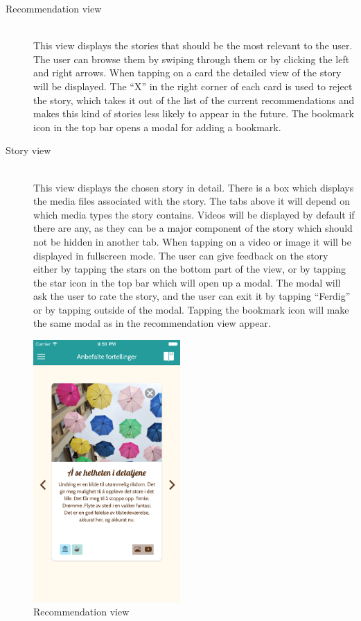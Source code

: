 \begin{description}
	
	\item[Recommendation view] \hfill \\ 
	This view displays the stories that should be the most relevant to the user. The user can browse them by swiping through them or by clicking the left and right arrows. When tapping on a card the detailed view of the story will be displayed. The “X” in the right corner of each card is used to reject the story, which takes it out of the list of the current recommendations and makes this kind of stories less likely to appear in the future. The bookmark icon in the top bar opens a modal for adding a bookmark. 
	
	\item[Story view] \hfill \\
	This view displays the chosen story in detail. There is a box which displays the media files associated with the story. The tabs above it will depend on which media types the story contains. Videos will be displayed by default if there are any, as they can be a major component of the story which should not be hidden in another tab. When tapping on a video or image it will be displayed in fullscreen mode. The user can give feedback on the story either by tapping the stars on the bottom part of the view, or by tapping the star icon in the top bar which will open up a modal. The modal will ask the user to rate the story, and the user can exit it by tapping “Ferdig” or by tapping outside of the modal. Tapping the bookmark icon will make the same modal as in the recommendation view appear. 

\end{description}

\begin{figure}[h!]
	\centering
	\includegraphics[width=0.5\textwidth]{fig/recommendation_view}
	\caption{Recommendation view}
	\label{Fig:recommendation_view}
\end{figure}

